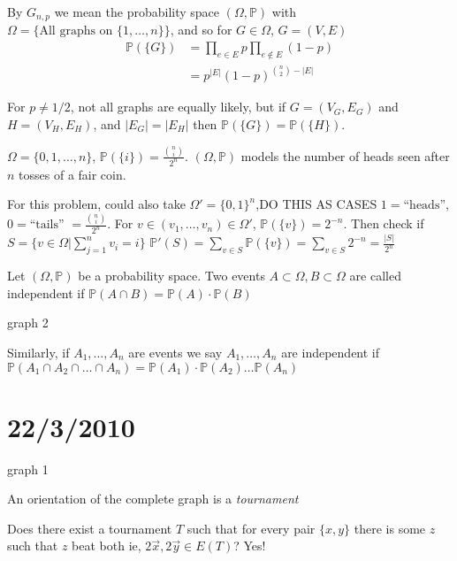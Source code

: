 \documentclass{article}
\begin{document}
\begin{defn}
By $G_{n,p}$ we mean the probability space $(\Omega, \mathbb{P})$ with $\Omega = \{ \text{All graphs on } \{1, \ldots, n\}\}$, and so for $G \in \Omega$, $G=(V,E)$ 
\begin{align*}
\mathbb{P}(\{G\}) &=  \prod_{e \in E} p \prod_{e \notin E} (1-p) \\
& = p^{|E|} (1-p)^{{n \choose 2} - |E|}
\end{align*}

For $p \neq 1/2$, not all graphs are equally likely, but if $G=(V_G, E_G)$ and $H = (V_H, E_H)$, and $|E_G| = |E_H|$ then $\mathbb{P}(\{G \}) = \mathbb{P}(\{H\})$.
\end{defn}

\begin{examp}
$\Omega = \{0, 1, \ldots, n\}$, $\mathbb{P}(\{i\}) = \frac{{n \choose i} }{2^n}$.  $(\Omega, \mathbb{P})$ models the number of heads seen after $n$ tosses of a fair coin.

For this problem, could also take $\Omega' = \{0,1\}^n$,DO THIS AS CASES $1=\text{``heads''}$, $0=\text{``tails''}$ $= \frac{{n \choose i}}{2^n} $.  For $v \in (v_1, \ldots, v_n) \in \Omega'$, $\mathbb{P}(\{v\})=2^{-n}$.  Then check if $S=\{v \in \Omega | \displaystyle \sum_{j=1}^n v_i = i \}$ $\mathbb{P}'(S) = \displaystyle \sum_{v \in S} \mathbb{P}(\{v\}) = \sum_{v \in S} 2^{-n} = \frac{|S|}{2^n}$
\end{examp}

\begin{defn}
Let $(\Omega, \mathbb{P})$ be a probability space.  Two events $A \subset \Omega, B \subset \Omega$ are called independent if $\mathbb{P}(A \cap B) = \mathbb{P}(A) \cdot \mathbb{P}(B)$

graph 2

Similarly, if $A_1, \ldots, A_n$ are events we say $A_1, \ldots, A_n$ are independent if $\mathbb{P}(A_1 \cap A_2 \cap \ldots \cap A_n) =\mathbb{P}(A_1) \cdot \mathbb{P}(A_2) \ldots \mathbb{P}(A_n)$
\end{defn}

\section*{22/3/2010}

graph 1

An orientation of the complete graph is a \emph{tournament}

Does there exist a tournament $T$ such that for every pair $\{x,y\}$ there is some $z$ such that $z$ beat both ie, $2 \overrightarrow{x}, 2\overrightarrow{y} \in E(T)$? Yes!
\end{document}
